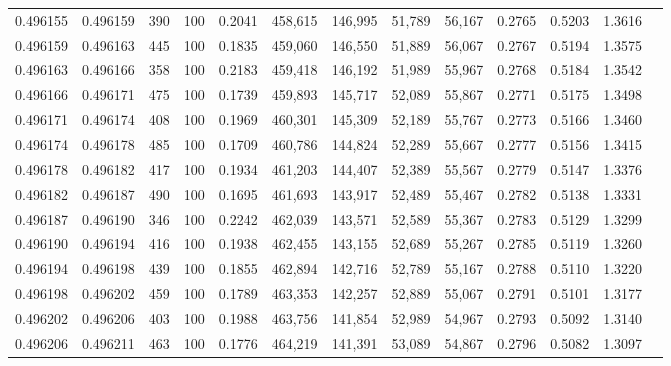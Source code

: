\begin{tabular}{rrrrrrrrrrrrr}
0.496155 & 0.496159 &   390 & 100 &                                     0.2041 & 458,615 & 146,995 &  51,789 &  56,167 & 0.2765 & 0.5203 & 1.3616 \\
0.496159 & 0.496163 &   445 & 100 &                                     0.1835 & 459,060 & 146,550 &  51,889 &  56,067 & 0.2767 & 0.5194 & 1.3575 \\
0.496163 & 0.496166 &   358 & 100 &                                     0.2183 & 459,418 & 146,192 &  51,989 &  55,967 & 0.2768 & 0.5184 & 1.3542 \\
0.496166 & 0.496171 &   475 & 100 &                                     0.1739 & 459,893 & 145,717 &  52,089 &  55,867 & 0.2771 & 0.5175 & 1.3498 \\
0.496171 & 0.496174 &   408 & 100 &                                     0.1969 & 460,301 & 145,309 &  52,189 &  55,767 & 0.2773 & 0.5166 & 1.3460 \\
0.496174 & 0.496178 &   485 & 100 &                                     0.1709 & 460,786 & 144,824 &  52,289 &  55,667 & 0.2777 & 0.5156 & 1.3415 \\
0.496178 & 0.496182 &   417 & 100 &                                     0.1934 & 461,203 & 144,407 &  52,389 &  55,567 & 0.2779 & 0.5147 & 1.3376 \\
0.496182 & 0.496187 &   490 & 100 &                                     0.1695 & 461,693 & 143,917 &  52,489 &  55,467 & 0.2782 & 0.5138 & 1.3331 \\
0.496187 & 0.496190 &   346 & 100 &                                     0.2242 & 462,039 & 143,571 &  52,589 &  55,367 & 0.2783 & 0.5129 & 1.3299 \\
0.496190 & 0.496194 &   416 & 100 &                                     0.1938 & 462,455 & 143,155 &  52,689 &  55,267 & 0.2785 & 0.5119 & 1.3260 \\
0.496194 & 0.496198 &   439 & 100 &                                     0.1855 & 462,894 & 142,716 &  52,789 &  55,167 & 0.2788 & 0.5110 & 1.3220 \\
0.496198 & 0.496202 &   459 & 100 &                                     0.1789 & 463,353 & 142,257 &  52,889 &  55,067 & 0.2791 & 0.5101 & 1.3177 \\
0.496202 & 0.496206 &   403 & 100 &                                     0.1988 & 463,756 & 141,854 &  52,989 &  54,967 & 0.2793 & 0.5092 & 1.3140 \\
0.496206 & 0.496211 &   463 & 100 &                                     0.1776 & 464,219 & 141,391 &  53,089 &  54,867 & 0.2796 & 0.5082 & 1.3097 \\

\end{tabular}
